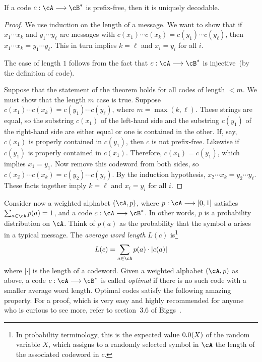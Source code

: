 \begin{theorem}
If a code $c: \cA \to \cB^*$ is prefix-free, then it is uniquely
decodable.
\end{theorem}

\begin{proof}
We use induction on the length of a message. We want
to show that if $x_1 \cdots x_k$ and $y_1 \cdots y_\ell$ are messages
with $c(x_1) \cdots c(x_k) = c(y_1) \cdots c(y_\ell)$, then
$x_1 \cdots x_k = y_1 \cdots y_\ell$. This in turn implies $k = \ell$
and $x_i = y_i$ for all $i$.

The case of length $1$ follows from the fact that $c: \cA \to \cB^*$
is injective~(by the definition of code).

Suppose that the statement of the theorem holds for all codes of
length $< m$. We must show that the length $m$ case is true. Suppose
$c(x_1) \cdots c(x_k) = c(y_1) \cdots c(y_\ell)$, where
$m = \max(k, \ell)$. These strings are equal, so the substring
$c(x_1)$ of the left-hand side and the substring $c(y_1)$ of the
right-hand side are either equal or one is contained in the other. If,
say, $c(x_1)$ is properly contained in $c(y_1)$, then $c$ is not
prefix-free. Likewise if $c(y_1)$ is properly contained in
$c(x_1)$. Therefore, $c(x_1) = c(y_1)$, which implies $x_1 = y_1$. Now
remove this codeword from both sides, so
$c(x_2) \cdots c(x_k) = c(y_2) \cdots c(y_\ell)$. By the induction
hypothesis, $x_2 \cdots x_k = y_2 \cdots y_\ell$. These facts together
imply $k = \ell$ and $x_i = y_i$ for all $i$.
\end{proof}

Consider now a weighted alphabet $(\cA, p)$, where $p: \cA \to [0,1]$
satisfies $\sum_{a \in \cA} p(a) = 1$, and a code $c: \cA \to \cB^*$.
In other words, $p$ is a probability distribution on $\cA$. Think of
$p(a)$ as the probability that the symbol $a$ arises in a typical
message. The \emph{average word length} $L(c)$ is\footnote{
  In probability terminology, this is the
  expected value $\E(X)$ of the random
  variable $X$, which assigns to a randomly selected symbol in $\cA$
  the length of the associated codeword in $c$.
}
\[
L(c)
=
\sum_{a \in \cA} p(a) \cdot |c(a)|
\]
where $|\cdot|$ is the length of a codeword.
Given a weighted alphabet $(\cA, p)$ as
above, a code $c: \cA \to \cB^*$ is called
\emph{optimal} if there is no such code with a
smaller average word length. Optimal codes satisfy the following
amazing property. For a proof, which is very easy and highly
recommended for anyone who is curious to see more, refer to
section~3.6 of Biggs~\cite{Biggs2009}.

